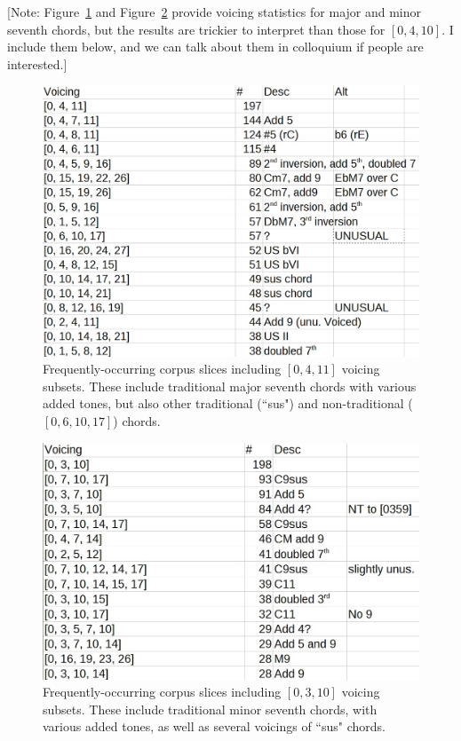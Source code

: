 [Note: Figure~\ref{[0,4,11]} and Figure~\ref{[0,3,10]} provide voicing statistics for major and minor seventh chords, but the results are trickier to interpret than those for $[0,4,10]$.  I include them below, and we can talk about them in colloquium if people are interested.]

\begin{figure}[h!]
	\centering
	\includegraphics[width=5in]{0411_tones.jpg}
	\caption{Frequently-occurring corpus slices including $[0,4,11]$ voicing subsets.  These include traditional major seventh chords with various added tones, but also other traditional (``sus") and non-traditional ($[0,6,10,17]$) chords.}
	\label{[0,4,11]}
\end{figure}

\begin{figure}[h!]
	\centering
	\includegraphics[width=5in]{0310_tones.jpg}
	\caption{Frequently-occurring corpus slices including $[0,3,10]$ voicing subsets.  These include traditional minor seventh chords, with various added tones, as well as several voicings of ``sus" chords.}
	\label{[0,3,10]}
\end{figure}
\newpage




